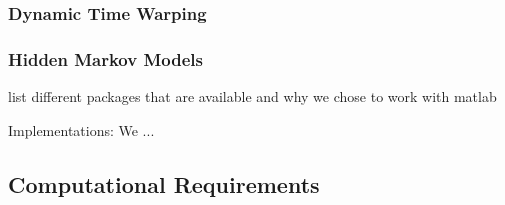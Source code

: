 \documentclass[a4paper, oneside]{csthesis}
\begin{document}


\subsubsection{Dynamic Time Warping}


\subsubsection{Hidden Markov Models}

list different packages that are available and why we chose to work with matlab

Implementations: We ...





\subsection{Computational Requirements}
\end{document}
